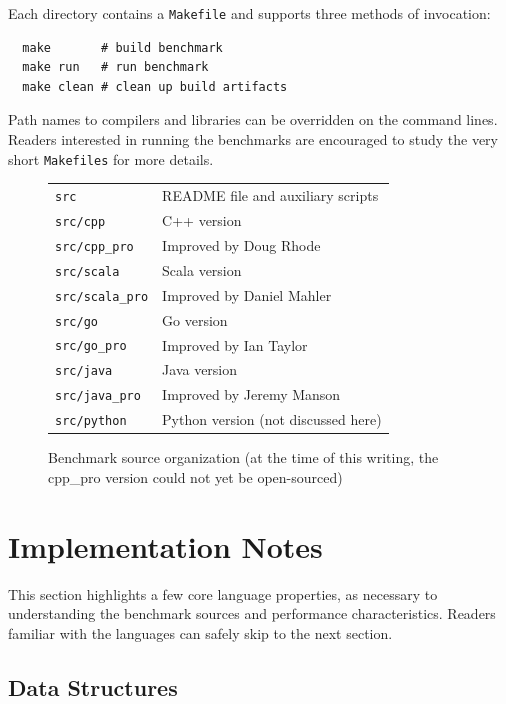 Each directory contains a {\tt Makefile} and supports three
methods of invocation:

\begin{footnotesize}
\begin{verbatim}
  make       # build benchmark
  make run   # run benchmark
  make clean # clean up build artifacts
\end{verbatim}
\end{footnotesize}

Path names to compilers and libraries can be overridden
on the command lines. Readers interested in running the benchmarks
are encouraged to study the very short {\tt Makefiles} for 
more details.

\begin{figure}
\begin{tabular}{ll}
{\tt\small src           }  & README file and auxiliary scripts  \\
{\tt\small src/cpp       }  & C++ version \\
{\tt\small src/cpp\_pro  }  & Improved by Doug Rhode \\
{\tt\small src/scala     }  & Scala version \\
{\tt\small src/scala\_pro}  & Improved by Daniel Mahler \\
{\tt\small src/go        }  & Go version \\
{\tt\small src/go\_pro   }  & Improved by Ian Taylor \\
{\tt\small src/java      }  & Java version \\
{\tt\small src/java\_pro }  & Improved by Jeremy Manson \\
{\tt\small src/python    }  & Python version (not discussed here) \\
\end{tabular}
\caption{Benchmark source organization (at the time of this writing,
the cpp\_pro version could not yet be open-sourced)}
\label{sourcedirs}
\end{figure}


\section{Implementation Notes}
\label{props}

This section highlights a few core language properties, as necessary to 
understanding the benchmark sources and performance characteristics. 
Readers familiar with the languages can safely skip to the next section.

\subsection{Data Structures}

